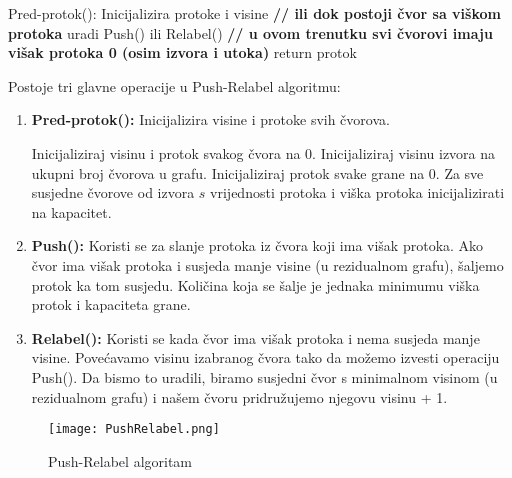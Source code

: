 \documentclass[11pt, a4paper]{article}
\begin{document}
	\begin{algorithm}
		\renewcommand{\thealgorithm}{}
		\caption{}
		\begin{algorithmic}[1]
			\STATE Pred-protok(): Inicijalizira protoke i visine
			\STATE \textbf{// ili dok postoji čvor sa viškom protoka}
			\STATE uradi Push() ili Relabel()
			\ENDWHILE
			\STATE \textbf{// u ovom trenutku svi čvorovi imaju višak protoka 0 (osim izvora i utoka)}
			\STATE return protok
		\end{algorithmic}
	\end{algorithm}
	
	\pagebreak
	Postoje tri glavne operacije u Push-Relabel algoritmu:
	\begin{enumerate}
		\item \textbf{Pred-protok():} Inicijalizira visine i protoke svih čvorova.
		
		\begin{algorithm}
			\renewcommand{\thealgorithm}{}
			\floatname{algorithm}{Pred-protok()}
			\caption{}
			\begin{algorithmic}[1]
				\STATE Inicijaliziraj visinu i protok svakog čvora na 0.
				\STATE Inicijaliziraj visinu izvora na ukupni broj čvorova u grafu.
				\STATE Inicijaliziraj protok svake grane na 0.
				\STATE Za sve susjedne čvorove od izvora $s$ vrijednosti protoka i viška protoka inicijalizirati na kapacitet.
			\end{algorithmic}
		\end{algorithm}
		
		\item \textbf{Push():} Koristi se za slanje protoka iz čvora koji ima višak protoka. Ako čvor ima višak protoka i susjeda manje visine (u rezidualnom grafu), šaljemo protok ka tom susjedu. Količina koja se šalje je jednaka minimumu viška protok i kapaciteta grane.
		
		\item \textbf{Relabel():} Koristi se kada čvor ima višak protoka i nema susjeda manje visine. Povećavamo visinu izabranog čvora tako da možemo izvesti operaciju Push(). Da bismo to uradili, biramo susjedni čvor s minimalnom visinom (u rezidualnom grafu) i našem čvoru pridružujemo njegovu visinu + 1.
		
	\end{enumerate}
	
	\begin{figure}[h]
		\centerline{\texttt{[image: PushRelabel.png]}}
		\caption{Push-Relabel algoritam}
		\label{fig:push-relabel}
	\end{figure}
	
\end{document}
